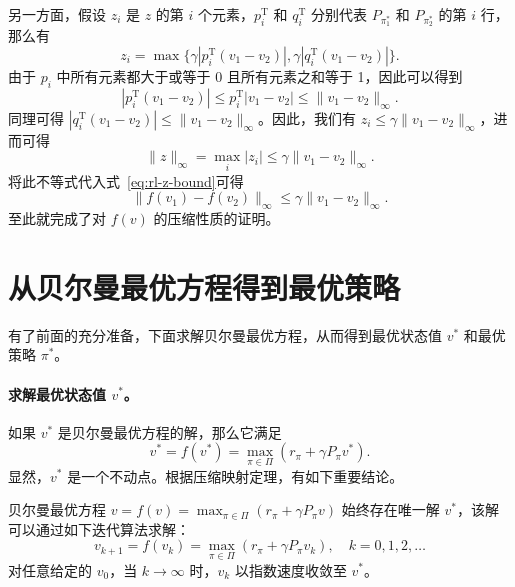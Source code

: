 \begin{derivation}
\begin{equation}
\label{eq:rl-z-bound}
\end{equation}
另一方面，假设 $z_i$ 是 $z$ 的第 $i$ 个元素，$p_i^{\mathrm{T}}$ 和 $q_i^{\mathrm{T}}$ 分别代表 $P_{\pi_1^*}$ 和 $P_{\pi_2^*}$ 的第 $i$ 行，那么有
\begin{equation}
  z_i = \max \{ \gamma |p_i^{\mathrm{T}} (v_1 - v_2)|, \gamma |q_i^{\mathrm{T}} (v_1 - v_2)| \}.
\end{equation}
由于 $p_i$ 中所有元素都大于或等于 0 且所有元素之和等于 1，因此可以得到
\begin{equation}
  | p_i^{\mathrm{T}} (v_1 - v_2) | \leqslant p_i^{\mathrm{T}} | v_1 - v_2 | \leqslant \| v_1 - v_2 \|_\infty.
\end{equation}
同理可得 $|q_i^{\mathrm{T}}(v_1 - v_2)| \leqslant \|v_1 - v_2\|_\infty$。因此，我们有 $z_i \leqslant \gamma \|v_1 - v_2\|_\infty$，进而可得
\begin{equation}
  \| z \|_\infty = \max_i |z_i| \leqslant \gamma \| v_1 - v_2 \|_\infty.
\end{equation}
将此不等式代入式~\eqref{eq:rl-z-bound}可得
\begin{equation}
  \| f(v_1) - f(v_2) \|_\infty \leqslant \gamma \| v_1 - v_2 \|_\infty.
\end{equation}
至此就完成了对 $f(v)$ 的压缩性质的证明。
\end{derivation}

\section{从贝尔曼最优方程得到最优策略}
\label{sec:rl-bellman-opt-solve}

有了前面的充分准备，下面求解贝尔曼最优方程，从而得到最优状态值 $v^*$ 和最优策略 $\pi^*$。

\paragraph{求解最优状态值 $v^*$。}如果 $v^*$ 是贝尔曼最优方程的解，那么它满足
\begin{equation}
  v^* = f(v^*) = \max_{\pi \in \varPi} (r_\pi + \gamma P_\pi v^*).
\end{equation}
显然，$v^*$ 是一个不动点。根据压缩映射定理，有如下重要结论。

\begin{theorem}
\label{thm:rl-existence-uniqueness}
贝尔曼最优方程 $v = f(v) = \max_{\pi \in \varPi}(r_\pi + \gamma P_\pi v)$ 始终存在唯一解 $v^*$，该解可以通过如下迭代算法求解：
\begin{equation}
  v_{k+1} = f(v_k) = \max_{\pi \in \varPi} (r_\pi + \gamma P_\pi v_k), \quad k = 0, 1, 2, \ldots
\end{equation}
对任意给定的 $v_0$，当 $k \to \infty$ 时，$v_k$ 以指数速度收敛至 $v^*$。
\end{theorem}

